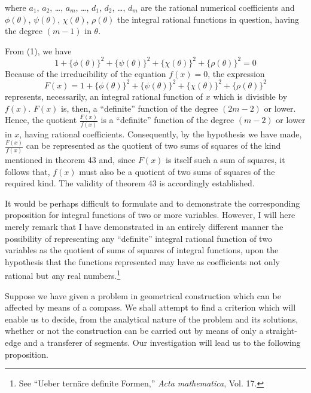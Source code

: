 \documentclass[11pt,oneside]{book}
\begin{document}
where $a_1$, $a_2$, \ldots, $a_m$, \ldots, $d_1$, $d_2$, \ldots, $d_m$ are the
rational numerical coefficients and $\phi(\theta)$, $\psi(\theta)$, $\chi(\theta)$,
$\rho(\theta)$ the integral rational functions in question, having
the degree $(m-1)$ in $\theta$.

From (1), we have
\[
1 + \{ \phi(\theta) \}^2 + \{\psi(\theta)\}^2 + \{\chi(\theta)\}^2 + \{\rho(\theta)\}^2 = 0
\]
Because of the irreducibility of the equation $f(x) = 0$,
the expression
\[
F(x) = 1 + \{ \phi(\theta) \}^2 + \{\psi(\theta)\}^2 + \{\chi(\theta)\}^2 + \{\rho(\theta)\}^2
\]
represents, necessarily, an integral rational function
of $x$ which is divisible by $f(x)$. $F(x)$ is, then, a
``definite'' function of the degree $(2m-2)$ or lower.
Hence, the quotient $\frac{F(x)}{f(x)}$ is a ``definite'' function of
the degree $(m-2)$ or lower in $x$, having rational coefficients.
Consequently, by the hypothesis we have
made, $\frac{F(x)}{f(x)}$  can be represented as the quotient of two
sums of squares of the kind mentioned in theorem 43
and, since $F(x)$ is itself such a sum of squares, it follows
that, $f(x)$ must also be a quotient of two sums of
squares of the required kind. The validity of theorem 43
is accordingly established.

It would be perhaps difficult to formulate and to
demonstrate the corresponding proposition for integral
functions of two or more variables. However, I will
here merely remark that I have demonstrated in an
entirely different manner the possibility of representing
any ``definite'' integral rational function of two
variables as the quotient of sums of squares of integral
functions, upon the hypothesis that the functions
represented may have as coefficients not only
rational but {\textit any} real numbers.\footnote{See
``Ueber tern\"are definite Formen,'' {\em Acta mathematica}, Vol. 17.
}

\label{p39}

Suppose we have given a problem in geometrical
construction which can be affected by means of a compass.
We shall attempt to find a criterion which will
enable us to decide, from the analytical nature of the
problem and its solutions, whether or not the construction
can be carried out by means of only a straight-edge
and a transferer of segments. Our investigation
will lead us to the following proposition.
\end{document}
